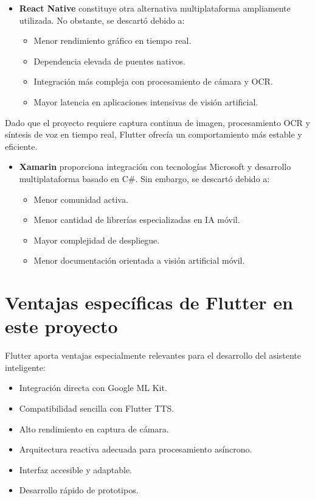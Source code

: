 \begin{itemize}
	\item \textbf{React Native} constituye otra alternativa multiplataforma ampliamente utilizada. No obstante, se descartó debido a:
	
	\begin{itemize}[noitemsep]
		\item Menor rendimiento gráfico en tiempo real.
		\item Dependencia elevada de puentes nativos.
		\item Integración más compleja con procesamiento de cámara y OCR.
		\item Mayor latencia en aplicaciones intensivas de visión artificial.
	\end{itemize}
\end{itemize}

Dado que el proyecto requiere captura continua de imagen, procesamiento OCR y síntesis de voz en tiempo real, Flutter ofrecía un comportamiento más estable y eficiente.

\begin{itemize}
	\item \textbf{Xamarin} proporciona integración con tecnologías Microsoft y desarrollo multiplataforma basado en C\#. Sin embargo, se descartó debido a:
	
	\begin{itemize}[noitemsep]
		\item Menor comunidad activa.
		\item Menor cantidad de librerías especializadas en IA móvil.
		\item Mayor complejidad de despliegue.
		\item Menor documentación orientada a visión artificial móvil.
	\end{itemize}
\end{itemize}

\section{Ventajas específicas de Flutter en este proyecto}

Flutter aporta ventajas especialmente relevantes para el desarrollo del asistente inteligente:

\begin{itemize}[noitemsep]
	\item Integración directa con Google ML Kit.
	\item Compatibilidad sencilla con Flutter TTS.
	\item Alto rendimiento en captura de cámara.
	\item Arquitectura reactiva adecuada para procesamiento asíncrono.
	\item Interfaz accesible y adaptable.
	\item Desarrollo rápido de prototipos.
\end{itemize}

